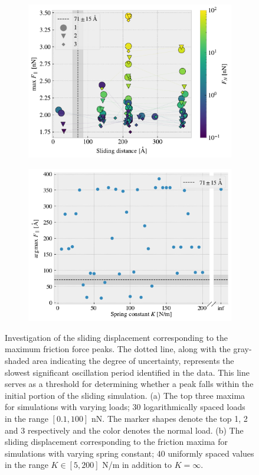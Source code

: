 \begin{figure}[!htb]
  \centering
  \begin{subfigure}[t]{0.49\textwidth}
      \centering
      \includegraphics[width=\textwidth]{figures/baseline/max_dist.pdf}
      \caption{}
        \label{fig:max_dist}
    \end{subfigure}
    \hfill
    \begin{subfigure}[t]{0.49\textwidth}
      \centering
      \includegraphics[width=\textwidth]{figures/baseline/max_vs_K}
      \caption{}
      \label{fig:max_vs_K}
    \end{subfigure}
    \caption{Investigation of the sliding displacement corresponding to the maximum friction force peaks. The dotted line, along with the gray-shaded area indicating the degree of uncertainty, represents the slowest significant oscillation period identified in the data. This line serves as a threshold for determining whether a peak falls within the initial portion of the sliding simulation. (a) The top three maxima for simulations with varying loads; 30 logarithmically spaced loads in the range $[0.1, 100]$ nN. The marker shapes denote the top 1, 2 and 3 respectively and the color denotes the normal load. (b) The sliding displacement corresponding to the friction maxima for simulations with varying spring constant; 40 uniformly spaced values in the range $K \in [5, 200]$ N/m in addition to $K = \infty$.}

\end{figure}

